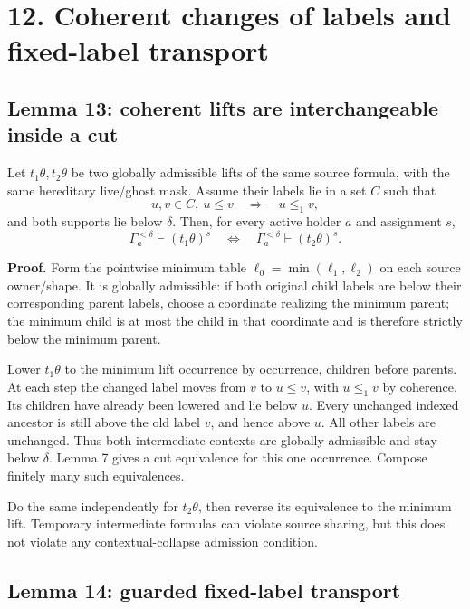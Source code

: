 \documentclass[
  11pt,
  letterpaper,
]{article}
\begin{document}
\section{12. Coherent changes of labels and fixed-label
transport}\label{coherent-changes-of-labels-and-fixed-label-transport}

\subsection{Lemma 13: coherent lifts are interchangeable inside a
cut}\label{lemma-13-coherent-lifts-are-interchangeable-inside-a-cut}

Let \(t_1\theta,t_2\theta\) be two globally admissible lifts of the same
source formula, with the same hereditary live/ghost mask. Assume their
labels lie in a set \(C\) such that \[
u,v\in C,\ u\leq v\quad\Longrightarrow\quad u\leq_1v,
\] and both supports lie below \(\delta\). Then, for every active holder
\(a\) and assignment \(s\), \[
\Gamma_a^{<\delta}\vdash(t_1\theta)^s
\quad\Longleftrightarrow\quad
\Gamma_a^{<\delta}\vdash(t_2\theta)^s.
\]

\textbf{Proof.} Form the pointwise minimum table
\(\ell_0=\min(\ell_1,\ell_2)\) on each source owner/shape. It is
globally admissible: if both original child labels are below their
corresponding parent labels, choose a coordinate realizing the minimum
parent; the minimum child is at most the child in that coordinate and is
therefore strictly below the minimum parent.

Lower \(t_1\theta\) to the minimum lift occurrence by occurrence,
children before parents. At each step the changed label moves from \(v\)
to \(u\leq v\), with \(u\leq_1v\) by coherence. Its children have
already been lowered and lie below \(u\). Every unchanged indexed
ancestor is still above the old label \(v\), and hence above \(u\). All
other labels are unchanged. Thus both intermediate contexts are globally
admissible and stay below \(\delta\). Lemma 7 gives a cut equivalence
for this one occurrence. Compose finitely many such equivalences.

Do the same independently for \(t_2\theta\), then reverse its
equivalence to the minimum lift. Temporary intermediate formulas can
violate source sharing, but this does not violate any
contextual-collapse admission condition.

\subsection{Lemma 14: guarded fixed-label
transport}\label{lemma-14-guarded-fixed-label-transport}
\end{document}
